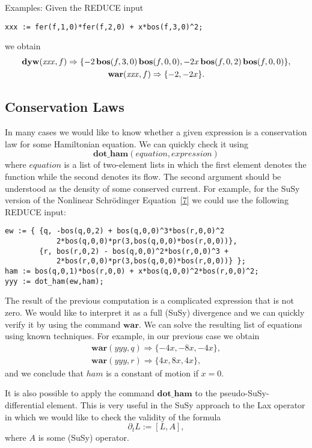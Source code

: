 {Examples: Given the REDUCE input
\begin{verbatim}
xxx := fer(f,1,0)*fer(f,2,0) + x*bos(f,3,0)^2;
\end{verbatim}
we obtain
\begin{gather*}
  \mathbf{dyw}(\mathit{xxx},f) \Rightarrow
  \{ -2\,\mathbf{bos}(f,3,0)\,\mathbf{bos}(f,0,0), -2x\,\mathbf{bos}(f,0,2)\,\mathbf{bos}(f,0,0) \}, \\
  \mathbf{war}(\mathit{xxx},f) \Rightarrow \{ -2, -2x \}.
\end{gather*}

\subsection{Conservation Laws}

In many cases we would like to know whether a given expression is a
conservation law for some Hamiltonian equation.  We can quickly check
it using
\begin{equation*}
  \mathbf{dot\_ham}(\mathit{equation},\mathit{expression})
\end{equation*}
where $\mathit{equation}$ is a list of two-element lists in which the
first element denotes the function while the second denotes its flow.
The second argument should be understood as the density of some
conserved current.  For example, for the SuSy version of the Nonlinear
Schr\"odinger Equation~\hyperref[susy2-bib]{[7]} we could use the
following REDUCE input:
\newpage
\begin{verbatim}
ew := { {q, -bos(q,0,2) + bos(q,0,0)^3*bos(r,0,0)^2
            2*bos(q,0,0)*pr(3,bos(q,0,0)*bos(r,0,0))},
        {r, bos(r,0,2) - bos(q,0,0)^2*bos(r,0,0)^3 +
            2*bos(r,0,0)*pr(3,bos(q,0,0)*bos(r,0,0))} };
ham := bos(q,0,1)*bos(r,0,0) + x*bos(q,0,0)^2*bos(r,0,0)^2;
yyy := dot_ham(ew,ham);
\end{verbatim}
The result of the previous computation is a complicated expression
that is not zero.  We would like to interpret it as a full (SuSy)
divergence and we can quickly verify it by using the command
$\mathbf{war}$.  We can solve the resulting list of equations using
known techniques.  For example, in our previous case we obtain
\begin{gather*}
  \mathbf{war}(yyy,q) \Rightarrow \{-4x,-8x,-4x\}, \\
  \mathbf{war}(yyy,r) \Rightarrow \{4x,8x,4x\},
\end{gather*}
and we conclude that $\mathit{ham}$ is a constant of motion if $x=0$.

It is also possible to apply the command $\mathbf{dot\_ham}$ to the
pseudo-SuSy-differential element.  This is very useful in the SuSy
approach to the Lax operator in which we would like to check the
validity of the formula
\begin{equation*}
  \partial_{t}L := [ L,A ],
\end{equation*}
where $A$ is some (SuSy) operator.

}
